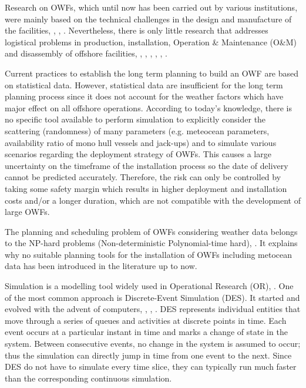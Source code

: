Research on OWFs, which until now has been carried out by various institutions, were mainly based on the technical challenges in the design and manufacture of the facilities, \cite{Miller2013}, \cite{SerranoGonzalez2014}, \cite{Perveen2014}. Nevertheless, there is only little research that addresses logistical problems in production, installation, Operation \& Maintenance (O\&M) and disassembly of offshore facilities, \cite{Scholz2010}, \cite{Lange2012}, \cite{COMPIT11}, \cite{COMPIT12}, \cite{aitsimulation}, \cite{El_Thalji_2012}.

Current practices to establish the long term planning to build an OWF are based on statistical data. However, statistical data are insufficient for the long term planning process since it does not account for the weather factors which have major effect on all offshore operations. According to today’s knowledge, there is no specific tool available to perform simulation to explicitly consider the scattering (randomness) of many parameters (e.g. meteocean parameters, availability ratio of mono hull vessels and jack-ups) and to simulate various scenarios regarding the deployment strategy of OWFs. This causes a large uncertainty on the timeframe of the installation process so the date of delivery cannot be predicted accurately. Therefore, the risk can only be controlled by taking some safety margin which results in higher deployment and installation costs and/or a longer duration, which are not compatible with the development of large OWFs.

The planning and scheduling problem of OWFs considering weather data belongs to the NP-hard problems (Non-deterministic Polynomial-time hard), \cite{leeuwen1990}. It explains why no suitable planning tools for the installation of OWFs including metocean data has been introduced in the literature up to now.

Simulation is a modelling tool widely used in Operational Research (OR), \cite{Burgess_1999,Tako_2010}. One of the most common approach is Discrete-Event Simulation (DES). It started and evolved with the advent of computers, \cite{Myron1987}, \cite {William1988}, \cite{robinson2005}. DES represents individual entities that move through a series of queues and activities at discrete points in time. Each event occurs at a particular instant in time and marks a change of state in the system. Between consecutive events, no change in the system is assumed to occur; thus the simulation can directly jump in time from one event to the next. Since DES do not have to simulate every time slice, they can typically run much faster than the corresponding continuous simulation.

